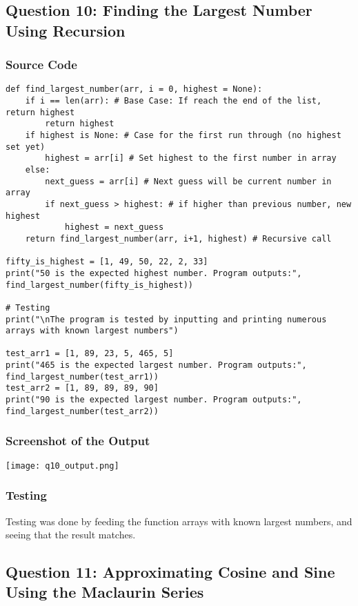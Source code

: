 \documentclass{article}
\begin{document}
\subsection*{Question 10: Finding the Largest Number Using Recursion}
\subsubsection*{Source Code}
\begin{lstlisting}
def find_largest_number(arr, i = 0, highest = None):
    if i == len(arr): # Base Case: If reach the end of the list, return highest
        return highest
    if highest is None: # Case for the first run through (no highest set yet)
        highest = arr[i] # Set highest to the first number in array
    else:
        next_guess = arr[i] # Next guess will be current number in array
        if next_guess > highest: # if higher than previous number, new highest
            highest = next_guess
    return find_largest_number(arr, i+1, highest) # Recursive call

fifty_is_highest = [1, 49, 50, 22, 2, 33]
print("50 is the expected highest number. Program outputs:", find_largest_number(fifty_is_highest))

# Testing
print("\nThe program is tested by inputting and printing numerous arrays with known largest numbers")

test_arr1 = [1, 89, 23, 5, 465, 5]
print("465 is the expected largest number. Program outputs:", find_largest_number(test_arr1))
test_arr2 = [1, 89, 89, 89, 90]
print("90 is the expected largest number. Program outputs:", find_largest_number(test_arr2))

\end{lstlisting}

\subsubsection*{Screenshot of the Output}
\texttt{[image: q10\_output.png]}

\subsubsection*{Testing}
Testing was done by feeding the function arrays with known largest numbers, and seeing that the result matches.

\subsection*{Question 11: Approximating Cosine and Sine Using the Maclaurin Series}
\end{document}
